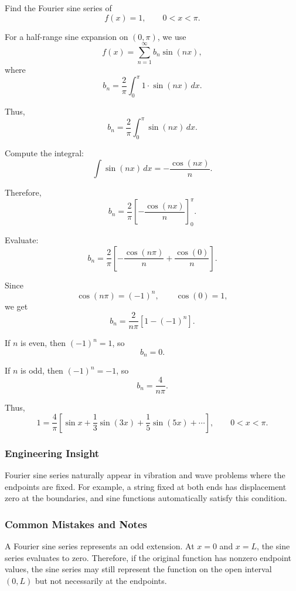 \begin{examplebox}
    Find the Fourier sine series of
    \[
        f(x)=1,\qquad 0<x<\pi.
    \]

    For a half-range sine expansion on $(0,\pi)$, we use
    \[
        f(x)=\sum_{n=1}^{\infty}b_n\sin(nx),
    \]
    where
    \[
        b_n=\frac{2}{\pi}\int_0^\pi 1\cdot \sin(nx)\,dx.
    \]

    Thus,
    \[
        b_n=\frac{2}{\pi}\int_0^\pi \sin(nx)\,dx.
    \]

    Compute the integral:
    \[
        \int \sin(nx)\,dx=-\frac{\cos(nx)}{n}.
    \]

    Therefore,
    \[
        b_n=
        \frac{2}{\pi}
        \left[
            -\frac{\cos(nx)}{n}
            \right]_0^\pi.
    \]

    Evaluate:
    \[
        b_n=
        \frac{2}{\pi}
        \left[
            -\frac{\cos(n\pi)}{n}
            +
            \frac{\cos(0)}{n}
            \right].
    \]

    Since
    \[
        \cos(n\pi)=(-1)^n,\qquad \cos(0)=1,
    \]
    we get
    \[
        b_n=
        \frac{2}{n\pi}
        \left[1-(-1)^n\right].
    \]

    If $n$ is even, then $(-1)^n=1$, so
    \[
        b_n=0.
    \]

    If $n$ is odd, then $(-1)^n=-1$, so
    \[
        b_n=\frac{4}{n\pi}.
    \]

    Thus,
    \[
        1=
        \frac{4}{\pi}
        \left[
            \sin x+\frac{1}{3}\sin(3x)+\frac{1}{5}\sin(5x)+\cdots
            \right],
        \qquad 0<x<\pi.
    \]
\end{examplebox}

\subsubsection*{Engineering Insight}

\begin{noteBox}
    Fourier sine series naturally appear in vibration and wave problems where the endpoints are fixed. For example, a string fixed at both ends has displacement zero at the boundaries, and sine functions automatically satisfy this condition.
\end{noteBox}

\subsubsection*{Common Mistakes and Notes}

\begin{conceptbox}
    A Fourier sine series represents an odd extension. At $x=0$ and $x=L$, the sine series evaluates to zero. Therefore, if the original function has nonzero endpoint values, the sine series may still represent the function on the open interval $(0,L)$ but not necessarily at the endpoints.
\end{conceptbox}